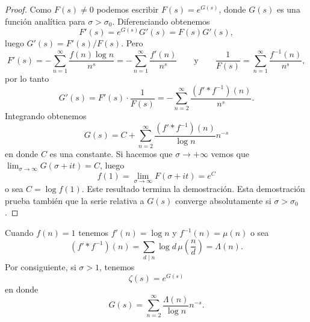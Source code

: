 \documentclass[12pt,a4paper]{book}
\begin{document}
    \begin{proof}
        Como $F(s)\neq0$ podemos escribir $F(s)=e^{G(s)}$, donde $G(s)$ es una función
        analítica para $\sigma>\sigma_{0}$. Diferenciando obtenemos
        \begin{equation*}
            F'(s)=e^{G(s)}G'(s)=F(s)G'(s),
        \end{equation*}
        luego $G'(s)=F'(s)/F(s)$. Pero
        \begin{equation*}
            F'(s)=-\sum_{n=1}^{\infty}\frac{f(n)\log n}{n^{s}}=-\sum_{n=1}^{\infty}\frac{f'(n)}{n^{s}}\qquad\text{y}\qquad\frac{1}{F(s)}=\sum_{n=1}^{\infty}\frac{f^{-1}(n)}{n^{s}},
        \end{equation*}
        por lo tanto
        \begin{equation*}
            G'(s)=F'(s)\cdot\frac{1}{F(s)}=-\sum_{n=2}^{\infty}\frac{(f'*f^{-1})(n)}{n^{s}}.
        \end{equation*}
        Integrando obtenemos
        \begin{equation*}
            G(s)=C+\sum_{n=2}^{\infty}\frac{(f'*f^{-1})(n)}{\log n}n^{-s}
        \end{equation*}
        en donde $C$ es una constante. Si hacemos que $\sigma\to+\infty$ vemos que
        $\lim_{\sigma\to\infty}G(\sigma+it)=C$, luego
        \begin{equation*}
            f(1)=\lim_{\sigma\to\infty}F(\sigma+it)=e^{C}
        \end{equation*}
        o sea $C=\log f(1)$. Este resultado termina la demostración. Esta demostración prueba
        también que la serie relativa a $G(s)$ converge absolutamente si $\sigma>\sigma_{0}$.
    \end{proof}

    \begin{ejemplo}
        Cuando $f(n)=1$ tenemos $f'(n)=\log n$ y $f^{-1}(n)=\mu(n)$ o sea
        \begin{equation*}
            (f'*f^{-1})(n)=\sum_{d\mid n}\log d\,\mu\left(\frac{n}{d}\right)=\Lambda(n).
        \end{equation*}
        Por consiguiente, si $\sigma>1$, tenemos
        \begin{equation}\label{eq:11-17}
            \zeta(s)=e^{G(s)}
        \end{equation}
        en donde
        \begin{equation*}
            G(s)=\sum_{n=2}^{\infty}\frac{\Lambda(n)}{\log n}n^{-s}.
        \end{equation*}
    \end{ejemplo}
\end{document}

